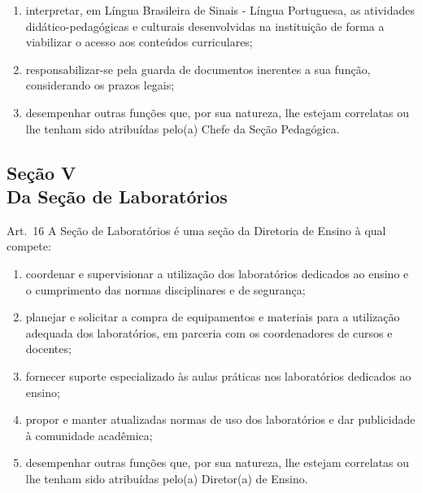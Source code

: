 \documentclass[a4paper,12pt]{report}
\begin{document}
\begin{enumerate}
\item interpretar, em Língua Brasileira de Sinais - Língua Portuguesa, as atividades 
      didático-pedagógicas e culturais desenvolvidas na instituição de forma a viabilizar o acesso aos conteúdos curriculares;

\item responsabilizar-se pela guarda de documentos inerentes a sua função, considerando os 
      prazos legais;

\item desempenhar outras funções que, por sua natureza, lhe estejam correlatas ou lhe 
      tenham sido atribuídas pelo(a) Chefe da Seção Pedagógica.

\end{enumerate}


\subsection{Seção V \\ Da Seção de Laboratórios}

Art.~16 A Seção de Laboratórios é uma seção da Diretoria de Ensino à qual compete:

\begin{enumerate}
\renewcommand{\labelenumi}{\Roman{enumi}}

\item coordenar e supervisionar a utilização dos laboratórios dedicados ao ensino e o 
      cumprimento das normas disciplinares e de segurança;
      
\item planejar e solicitar a compra de equipamentos e materiais para a utilização adequada 
      dos laboratórios, em parceria com os coordenadores de cursos e docentes;

\item fornecer suporte especializado às aulas práticas nos laboratórios dedicados ao 
      ensino;

\item propor e manter atualizadas normas de uso dos laboratórios e dar publicidade à 
      comunidade acadêmica;

\item desempenhar outras funções que, por sua natureza, lhe estejam correlatas ou lhe 
      tenham sido atribuídas pelo(a) Diretor(a) de Ensino.
\end{enumerate}
\end{document}
